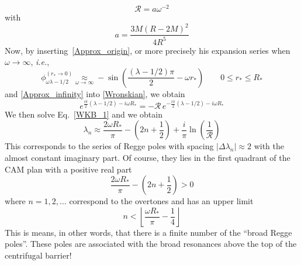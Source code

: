 \documentclass[aps,prd,longbibliography,reprint,twocolumn,amsmath,amssymb,amsfonts,showpacs,superscriptaddress]{revtex4-1}%
\begin{document}
\begin{equation}\label{R_reflection_1}
  \mathcal{R} = a \omega^{-2}
\end{equation}
with
\begin{equation}\label{a_def}
a= \frac{3M \left(R-2M\right)^2}{4 R^5}
\end{equation}
Now, by inserting~\eqref{Approx_origin}, or more precisely his expansion series when $\omega \to \infty$, \textit{i.e.},
\begin{equation}\label{Approx_origin_bis}
  \phi^{(r_* \to 0)}_{\omega\lambda-1/2} \underset{\omega \to \infty}{\approx} - \sin\left(\frac{\left(\lambda-1/2\right)\pi}{2}-\omega r_*\right)\quad\quad 0\leq r_*\leq R_*
\end{equation}
and \eqref{Approx_infinity} into  \eqref{Wronskian}, we obtain
\begin{equation}\label{WKB_1}
   e^{\frac{i\pi}{2}(\lambda-1/2)-i \omega R_*}=-\mathcal{R}\, e^{-\frac{i\pi}{2}(\lambda-1/2)-i \omega R_*}
\end{equation}
We then solve Eq.~\eqref{WKB_1} and we obtain
\begin{equation}\label{lambda_Approx}
  \lambda_n \approx \frac{2 \omega R_*}{\pi}-\left(2n+\frac{1}{2}\right)+\frac{i}{\pi} \ln\left(\frac{1}{\mathcal{R}}\right)
\end{equation}
This corresponds to the series of Regge poles with spacing $|\Delta \lambda_n|\approx 2$ with the almost constant  imaginary part. Of course, they lies in the first quadrant of the CAM plan with a positive real part
\begin{equation}\label{Real_Part}
  \frac{2 \omega R_*}{\pi}-\left(2n+\frac{1}{2}\right)>0
\end{equation}
where $n =1,2,\ldots$ correspond to the overtones and has an upper limit
\begin{equation}\label{Limit_Broad_RP}
n < \left\lfloor \frac{\omega R_*}{\pi} - \frac{1}{4}\right\rfloor
\end{equation} 
This is means, in other words, that there is a finite number of the ``broad Regge poles''. These poles are associated with the broad resonances above the top of the centrifugal barrier!

\end{document}
